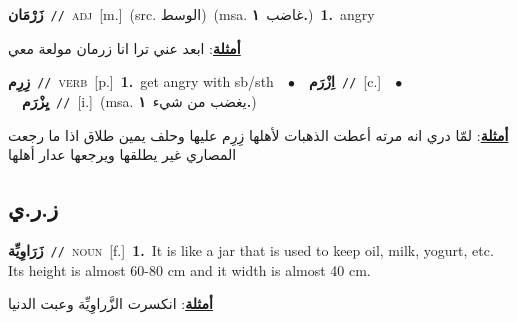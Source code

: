 \documentclass[10pt,a4paper,twoside]{article} %
\begin{document}
\begin{multicols}{2}
{\setlength\topsep{0pt}\textbf{\foreignlanguage{arabic}{زَرْمَان}}\ {\color{gray}\texttt{//}\color{black}}\ \textsc{adj}\ [m.]\ (src. \color{gray}\foreignlanguage{arabic}{الوسط}\color{black})\ \color{gray}(msa. \foreignlanguage{arabic}{غاضب}~\foreignlanguage{arabic}{\textbf{١.}})\color{black}\ \textbf{1.}~angry\  \begin{flushright}\color{gray}\foreignlanguage{arabic}{\textbf{\underline{\foreignlanguage{arabic}{أمثلة}}}: ابعد عني ترا انا زرمان مولعة معي}\end{flushright}\color{black}} \vspace{2mm}

{\setlength\topsep{0pt}\textbf{\foreignlanguage{arabic}{زِرِم}}\ {\color{gray}\texttt{//}\color{black}}\ \textsc{verb}\ [p.]\ \textbf{1.}~get angry with sb/sth\ \ $\bullet$\ \ \setlength\topsep{0pt}\textbf{\foreignlanguage{arabic}{اِزْرَم}}\ {\color{gray}\texttt{//}\color{black}}\ [c.]\ \ $\bullet$\ \ \setlength\topsep{0pt}\textbf{\foreignlanguage{arabic}{يِزْرَم}}\ {\color{gray}\texttt{//}\color{black}}\ [i.]\ \color{gray}(msa. \foreignlanguage{arabic}{يغضب من شيء}~\foreignlanguage{arabic}{\textbf{١.}})\color{black}\  \begin{flushright}\color{gray}\foreignlanguage{arabic}{\textbf{\underline{\foreignlanguage{arabic}{أمثلة}}}: لمّا دري انه مرته أعطت الذهبات لأهلها زِرِم عليها وحلف يمين طلاق اذا ما رجعت المصاري غير يطلقها ويرجعها عدار أهلها}\end{flushright}\color{black}} \vspace{2mm}

\vspace{-3mm}
\subsection*{\color{blue}\foreignlanguage{arabic}{ز.ر.ي}\color{blue}{}} 

{\setlength\topsep{0pt}\textbf{\foreignlanguage{arabic}{زَرَاوِيِّة}}\ {\color{gray}\texttt{//}\color{black}}\ \textsc{noun}\ [f.]\ \textbf{1.}~It is like a jar that is used to keep oil, milk, yogurt, etc. Its height is almost 60-80 cm and it width is almost 40 cm.\  \begin{flushright}\color{gray}\foreignlanguage{arabic}{\textbf{\underline{\foreignlanguage{arabic}{أمثلة}}}: انكسرت الزَّراوِيِّة وعبت الدنيا}\end{flushright}\color{black}} \vspace{2mm}


\end{multicols}
\end{document}
